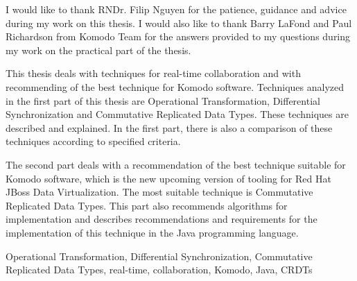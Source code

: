 \documentclass[12pt,oneside]{fithesis2}
\begin{document}
\FrontMatter
\ThesisTitlePage
\begin{ThesisDeclaration}
\DeclarationText
\AdvisorName
\end{ThesisDeclaration}
\begin{ThesisThanks}
I would like to thank RNDr. Filip Nguyen for the patience, guidance and advice during my work on this thesis. I would also like to thank Barry LaFond and Paul Richardson from Komodo Team for the answers provided to my questions during my work on the practical part of the thesis.
\end{ThesisThanks}
\begin{ThesisAbstract}
This thesis deals with techniques for real-time collaboration and with recommending of the best technique for Komodo software. Techniques analyzed in the first part of this thesis are Operational Transformation, Differential Synchronization and Commutative Replicated Data Types. These techniques are described and explained. In the first part, there is also a comparison of these techniques according to specified criteria.
\par The second part deals with a recommendation of the best technique suitable for Komodo software, which is the new upcoming version of tooling for Red Hat JBoss Data Virtualization. The most suitable technique is Commutative Replicated Data Types. This part also recommends algorithms for implementation and describes recommendations and requirements for the implementation of this technique in the Java programming language.
\end{ThesisAbstract}
\begin{ThesisKeyWords}
Operational Transformation, Differential Synchronization, Commutative Replicated Data Types, real-time, collaboration, Komodo, Java, CRDTs
\end{ThesisKeyWords}
\tableofcontents 
\MainMatter
\end{document}
